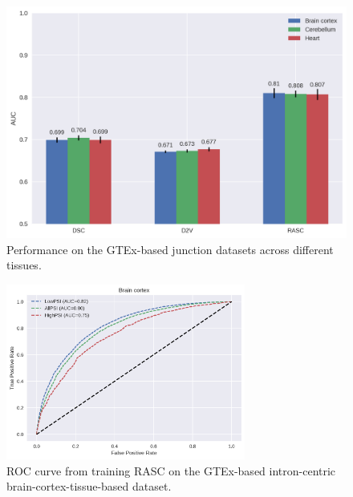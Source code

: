 \begin{figure}[h]
	\centering\includegraphics[width=1\textwidth]{../visualizations/ch5-results/gtex_junc_barcharts.png} 
	\caption{Performance on the GTEx-based junction datasets across different tissues. }
	\label{fig:gtex_junc_barcharts}

\end{figure}


\begin{figure}[h]
	\centering\includegraphics[width=0.7\textwidth]{../visualizations/ch5-results/gtex_junc_brain_roc.png} 
	\caption{ROC curve from training RASC on the GTEx-based intron-centric brain-cortex-tissue-based dataset. }
	\label{fig:gtex_junc_rocs}
\end{figure}



